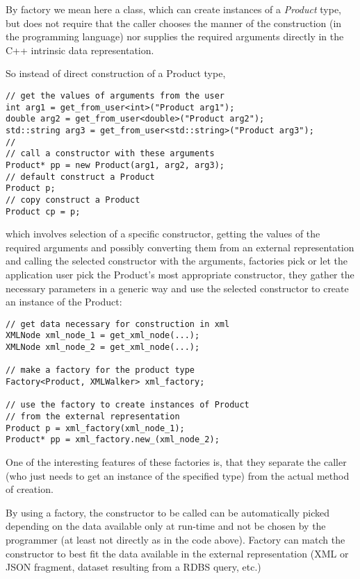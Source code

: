 By factory we mean here a class, which can create
instances of a {\em Product} type, but does not require that
the caller chooses the manner of the construction (in the programming
language) nor supplies the required arguments directly
in the C++ intrinsic data representation.

So instead of direct construction of a Product type,

\begin{lstlisting}
// get the values of arguments from the user
int arg1 = get_from_user<int>("Product arg1");
double arg2 = get_from_user<double>("Product arg2");
std::string arg3 = get_from_user<std::string>("Product arg3");
//
// call a constructor with these arguments
Product* pp = new Product(arg1, arg2, arg3);
// default construct a Product
Product p;
// copy construct a Product
Product cp = p;
\end{lstlisting}

which involves selection of a specific constructor, getting
the values of the required arguments and possibly converting 
them from an external representation and calling the selected
constructor with the arguments, 
factories pick or let the application user pick the Product's most
appropriate constructor, they gather the necessary parameters
in a generic way and use the selected constructor to create
an instance of the Product:

\begin{lstlisting}
// get data necessary for construction in xml
XMLNode xml_node_1 = get_xml_node(...);
XMLNode xml_node_2 = get_xml_node(...);

// make a factory for the product type
Factory<Product, XMLWalker> xml_factory;

// use the factory to create instances of Product
// from the external representation
Product p = xml_factory(xml_node_1);
Product* pp = xml_factory.new_(xml_node_2);
\end{lstlisting}

One of the interesting features of these factories is,
that they separate the caller (who just needs to get an instance
of the specified type) from the actual method of creation.

By using a factory, the constructor to be called can 
be automatically picked depending on the data available only at run-time
and not be chosen by the programmer (at least not directly
as in the code above). Factory can match
the constructor to best fit the data available in the external
representation (XML or JSON fragment, dataset resulting from a
RDBS query, etc.)

